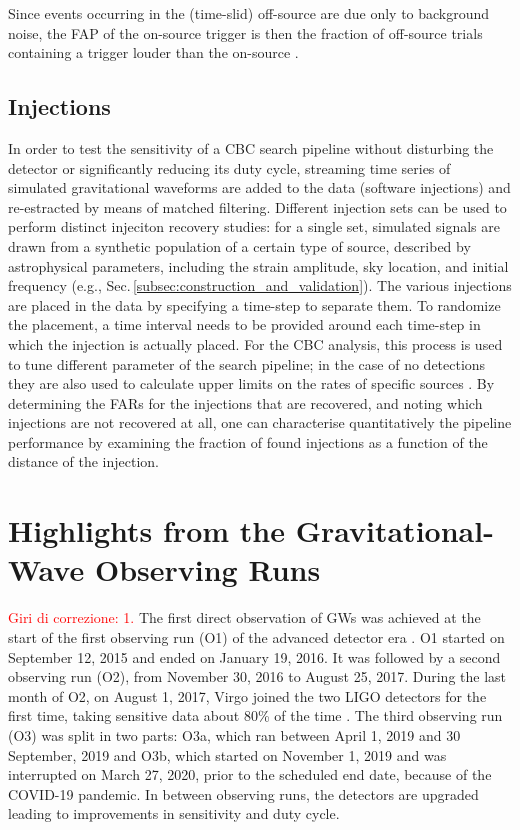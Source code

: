 \documentclass[binding=0.6cm, LaM]{sapthesis}
\newcommand{\fpg}[1]{\textcolor{red}{#1} }
\begin{document}
 	Since events occurring in the (time-slid) off-source are due only to background noise,
	the FAP of the on-source trigger is then the fraction of off-source trials containing a trigger louder than the on-source \cite{46}.

\section{Injections}
\label{sec:injections}
	In order to test the sensitivity of a CBC search pipeline without disturbing the detector or significantly reducing its duty cycle,
        streaming time series of simulated gravitational waveforms are added to the data (software injections)
        and re-estracted by means of matched filtering.
        Different injection sets can be used to perform distinct injeciton recovery studies:
        for a single set, simulated signals are drawn from a synthetic population of a certain type of source,
        described by astrophysical parameters, including the strain amplitude, sky location,
        and initial frequency \cite{30} (e.g., Sec.\,\ref{subsec:construction_and_validation}).
        The various injections are placed in the data by specifying a time-step to separate them.
        To randomize the placement, a time interval needs to be provided around
        each time-step in which the injection is actually placed.
        For the CBC analysis, this process is used to tune different parameter of the search pipeline;
        in the case of no detections they are also used to calculate upper limits on the rates of specific sources \cite{47}.
        By determining the FARs for the injections that are recovered,
        and noting which injections are not recovered at all,
        one can characterise quantitatively the pipeline performance \cite{47, 48}
        by examining the fraction of found injections as a function of the distance of the injection.

	
\chapter{Highlights from the Gravitational-Wave Observing Runs}
\label{ch:ObservingRuns}
\fpg{Giri di correzione: 1.}%
	The first direct observation of GWs was achieved at the start of the first observing run (O1) 
	of the advanced detector era \cite{52}.
	O1 started on September 12, 2015 and ended on January 19, 2016.
	It was followed by a second observing run (O2), 
	from November 30, 2016 to August 25, 2017.
	During the last month of O2, on August 1, 2017, Virgo joined the two LIGO detectors for the first time, 	
	taking sensitive data about 80\% of the time \cite{13}.
	The third observing run (O3) was split in two parts: O3a, which ran between April 1, 2019 and 30 September, 2019 and O3b, 
	which started on November 1, 2019 and was interrupted on March 27, 2020, prior to the scheduled end date, 
	because of the COVID-19 pandemic.
	In between observing runs, the detectors are upgraded leading to improvements in sensitivity and duty cycle.
\end{document}
